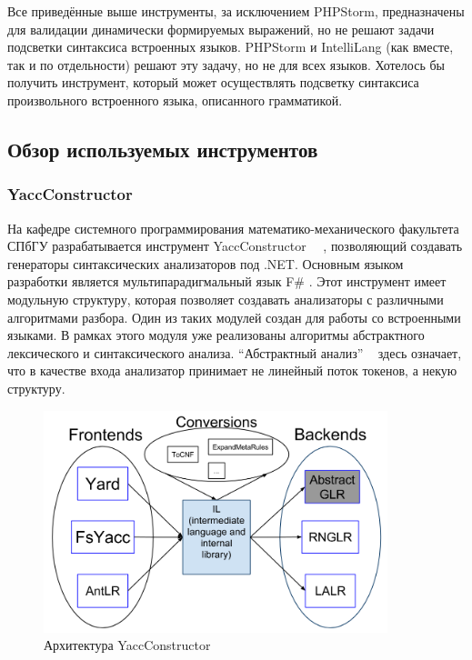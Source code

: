 Все приведённые выше инструменты, за исключением PHPStorm, предназначены для валидации динамически формируемых выражений, но не решают задачи подсветки синтаксиса встроенных языков. PHPStorm и IntelliLang (как вместе, так и по отдельности) решают эту задачу, но не для всех языков. Хотелось бы получить инструмент, который может осуществлять подсветку синтаксиса произвольного встроенного языка, описанного грамматикой.

\subsection{Обзор используемых инструментов}
\subsubsection{YaccConstructor}
На кафедре системного программирования математико-механического факультета СПбГУ разрабатывается инструмент YaccConstructor ~\cite{YC_paper}~\cite{YC_site}, позволяющий создавать генераторы синтаксических анализаторов под .NET. Основным языком разработки является мультипарадигмальный язык F\# \cite{FSharp}. Этот инструмент имеет модульную структуру, которая позволяет создавать анализаторы с различными алгоритмами разбора. Один из таких модулей создан для работы со встроенными языками. В рамках этого модуля уже реализованы алгоритмы абстрактного лексического и синтаксического анализа. “Абстрактный анализ” ~\cite{ARNGLR} здесь означает, что в качестве входа анализатор принимает не линейный поток токенов, а некую структуру. 

\begin{figure}[h]
\centering
\includegraphics[width=100mm]{Pictures/YC_base.png}
\caption{Архитектура YaccConstructor}
\end{figure}

